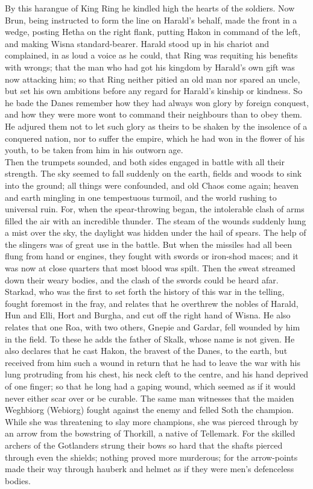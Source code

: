 \documentclass[10pt,a4paper]{report}
\begin{document}
By this harangue of King Ring he kindled high the hearts of the soldiers. Now Brun, being instructed to form the line on Harald's behalf, made the front in a wedge, posting Hetha on the right flank, putting Hakon in command of the left, and making Wisna standard-bearer. Harald stood up in his chariot and complained, in as loud a voice as he could, that Ring was requiting his benefits with wrongs; that the man who had got his kingdom by Harald's own gift was now attacking him; so that Ring neither pitied an old man nor spared an uncle, but set his own ambitions before any regard for Harald's kinship or kindness. So he bade the Danes remember how they had always won glory by foreign conquest, and how they were more wont to command their neighbours than to obey them. He adjured them not to let such glory as theirs to be shaken by the insolence of a conquered nation, nor to suffer the empire, which he had won in the flower of his youth, to be taken from him in his outworn age.\\

Then the trumpets sounded, and both sides engaged in battle with all their strength. The sky seemed to fall suddenly on the earth, fields and woods to sink into the ground; all things were confounded, and old Chaos come again; heaven and earth mingling in one tempestuous turmoil, and the world rushing to universal ruin. For, when the spear-throwing began, the intolerable clash of arms filled the air with an incredible thunder. The steam of the wounds suddenly hung a mist over the sky, the daylight was hidden under the hail of spears. The help of the slingers was of great use in the battle. But when the missiles had all been flung from hand or engines, they fought with swords or iron-shod maces; and it was now at close quarters that most blood was spilt. Then the sweat streamed down their weary bodies, and the clash of the swords could be heard afar.\\

Starkad, who was the first to set forth the history of this war in the telling, fought foremost in the fray, and relates that he overthrew the nobles of Harald, Hun and Elli, Hort and Burgha, and cut off the right hand of Wisna. He also relates that one Roa, with two others, Gnepie and Gardar, fell wounded by him in the field. To these he adds the father of Skalk, whose name is not given. He also declares that he cast Hakon, the bravest of the Danes, to the earth, but received from him such a wound in return that he had to leave the war with his lung protruding from his chest, his neck cleft to the centre, and his hand deprived of one finger; so that he long had a gaping wound, which seemed as if it would never either scar over or be curable. The same man witnesses that the maiden Weghbiorg (Webiorg) fought against the enemy and felled Soth the champion. While she was threatening to slay more champions, she was pierced through by an arrow from the bowstring of Thorkill, a native of Tellemark. For the skilled archers of the Gotlanders strung their bows so hard that the shafts pierced through even the shields; nothing proved more murderous; for the arrow-points made their way through hauberk and helmet as if they were men's defenceless bodies.\\
\end{document}
